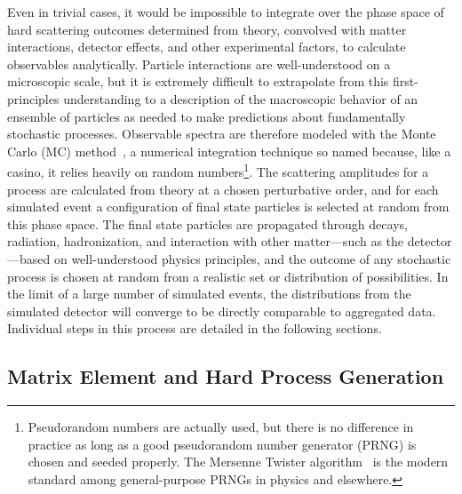 Even in trivial cases, it would be impossible to integrate over the phase space of hard scattering outcomes determined from theory, convolved with matter interactions, detector effects, and other experimental factors, to calculate observables analytically.
Particle interactions are well-understood on a microscopic scale, but it is extremely difficult to extrapolate from this first-principles understanding to a description of the macroscopic behavior of an ensemble of particles as needed to make predictions about fundamentally stochastic processes.
Observable spectra are therefore modeled with the Monte Carlo (MC) method~\cite{Metropolis:10.2307.2280232,Olive:2016xmw}, a numerical integration technique so named because, like a casino, it relies heavily on random numbers\footnote{Pseudorandom numbers are actually used, but there is no difference in practice as long as a good pseudorandom number generator (PRNG) is chosen and seeded properly. The Mersenne Twister algorithm~\cite{Matsumoto:1998:MTE:272991.272995} is the modern standard among general-purpose PRNGs in physics and elsewhere.}.
The scattering amplitudes for a process are calculated from theory at a chosen perturbative order, and for each simulated event a configuration of final state particles is selected at random from this phase space.
The final state particles are propagated through decays, radiation, hadronization, and interaction with other matter---such as the detector---based on well-understood physics principles, and the outcome of any stochastic process is chosen at random from a realistic set or distribution of possibilities.
In the limit of a large number of simulated events, the distributions from the simulated detector will converge to be directly comparable to aggregated data.
Individual steps in this process are detailed in the following sections.


\subsection{Matrix Element and Hard Process Generation}

